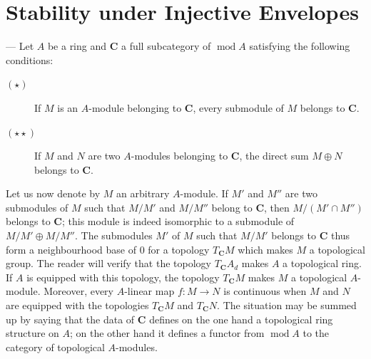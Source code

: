 %
%

\section{Stability under Injective Envelopes}

--- Let $A$ be a ring and $\mathbf{C}$ a full subcategory of
$\operatorname{mod} A$ satisfying the following conditions:
\begin{description}
\item[\normalfont $(\star)$] If $M$ is an $A$-module belonging to
  $\mathbf{C}$, every submodule of $M$ belongs to $\mathbf{C}$.
\item[\normalfont $(\star\star)$] If $M$ and $N$ are two $A$-modules
  belonging to $\mathbf{C}$, the direct sum $M \oplus N$ belongs to
  $\mathbf{C}$.
\end{description}

Let us now denote by $M$ an arbitrary $A$-module. If $M'$ and $M''$ are
two submodules of $M$ such that $M/M'$ and $M/M''$ belong to
$\mathbf{C}$, then $M/(M' \cap M'')$ belongs to $\mathbf{C}$; this module
is indeed isomorphic to a submodule of $M/M' \oplus M/M''$. The
submodules $M'$ of $M$ such that $M/M'$ belongs to $\mathbf{C}$ thus
form a neighbourhood base of $0$ for a topology $T_{\mathbf{C}}M$ which
makes $M$ a topological group. The reader will verify that the topology
$T_{\mathbf{C}}A_d$ makes $A$ a topological ring. If $A$ is equipped with
this topology, the topology $T_{\mathbf{C}}M$ makes $M$ a topological
$A$-module. Moreover, every $A$-linear map $f : M \to N$ is continuous
when $M$ and $N$ are equipped with the topologies $T_{\mathbf{C}}M$ and
$T_{\mathbf{C}}N$. The situation may be summed up by saying that the
data of $\mathbf{C}$ defines on the one hand a topological ring
structure on $A$; on the other hand it defines a functor from
$\operatorname{mod} A$ to the category of topological $A$-modules.

